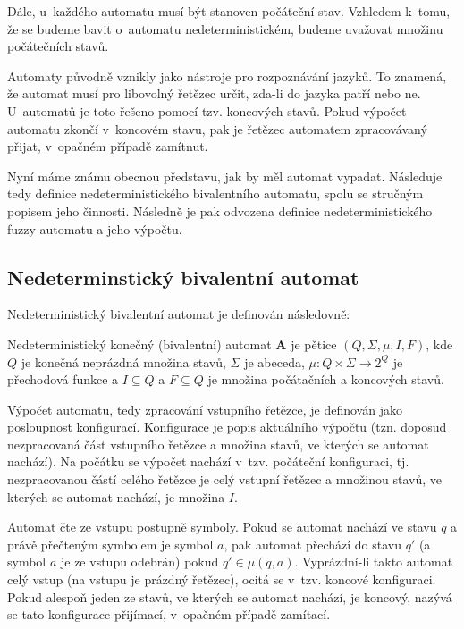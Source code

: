 Dále, u~každého automatu musí být stanoven počáteční stav. Vzhledem k~tomu, že se budeme bavit o~automatu nedeterministickém, budeme uvažovat množinu počátečních stavů.

Automaty původně vznikly jako nástroje pro rozpoznávání jazyků. To znamená, že automat musí pro libovolný řetězec určit, zda-li do jazyka patří nebo ne. U~automatů je toto řešeno pomocí tzv. koncových stavů. Pokud výpočet automatu zkončí v~koncovém stavu, pak je řetězec automatem zpracovávaný přijat, v~opačném případě zamítnut.

Nyní máme známu obecnou představu, jak by měl automat vypadat. Následuje tedy definice nedeterministického bivalentního automatu, spolu se stručným popisem jeho činnosti. Následně je pak odvozena definice nedeterministického fuzzy automatu a jeho výpočtu.

\subsection{Nedeterminstický bivalentní automat}
Nedeterministický bivalentní automat je definován následovně:

\begin{definition}\label{def-NedBivAut}
 Nedeterministický konečný (bivalentní) automat $\mathbf{A}$ je pětice $(Q, \Sigma, \mu, I, F)$, kde $Q$ je konečná neprázdná množina stavů, $\Sigma$ je abeceda, $\mu: Q \times \Sigma \rightarrow 2^Q$ je přechodová funkce a $I \subseteq Q$ a $F \subseteq Q$ je množina počátačních a koncových stavů.
\end{definition}

Výpočet automatu, tedy zpracování vstupního řetězce, je definován jako posloupnost konfigurací. Konfigurace je popis aktuálního  výpočtu (tzn. doposud nezpracovaná část vstupního řetězce a množina stavů, ve kterých se automat nachází). Na počátku se výpočet nachází v~tzv. počáteční konfiguraci, tj. nezpracovanou částí celého řetězce je celý vstupní řetězec a množinou stavů, ve kterých se automat nachází, je množina $I$.

Automat čte ze vstupu postupně symboly. Pokud se automat nachází ve stavu $q$ a právě přečteným symbolem je symbol $a$, pak automat přechází do stavu $q'$ (a symbol $a$ je ze vstupu odebrán) pokud $q' \in \mu(q, a)$. Vyprázdní-li takto automat celý vstup (na vstupu je prázdný řetězec), ocitá se v~tzv. koncové konfiguraci. Pokud alespoň jeden ze stavů, ve kterých se automat nachází, je koncový, nazývá se tato konfigurace přijímací, v~opačném případě zamítací.

